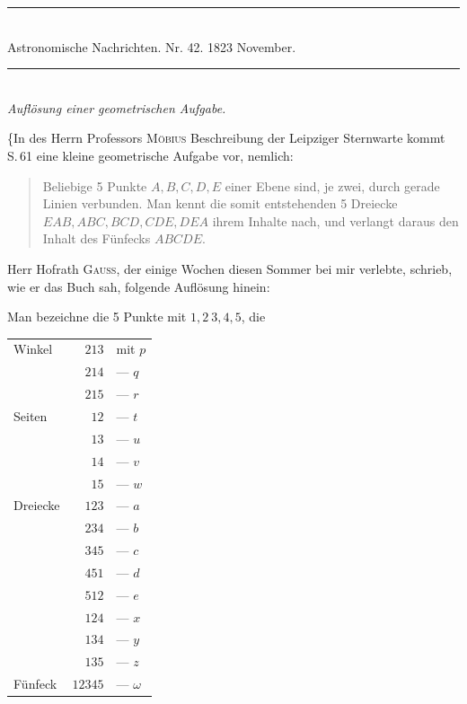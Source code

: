 \clearpage
{}%
\begin{center}
\rule{.8\textwidth}{.4pt}\\[4pt]
Astronomische Nachrichten. Nr. 42. 1823 November.\\[4pt]
\rule{.8\textwidth}{.4pt}\\[12pt]
\textit{Auflösung einer geometrischen Aufgabe.}
\end{center}
\hspace*{\parindent}\{In des Herrn Professors \textsc{Möbius} Beschreibung der Leipziger Sternwarte kommt S.\,61 eine kleine geometrische Aufgabe vor, nemlich:
\begin{quote}
Beliebige 5 Punkte \(A,B,C,D,E\) einer Ebene sind, je zwei, durch gerade Linien verbunden. Man kennt die somit entstehenden 5 Dreiecke \(EAB,ABC,BCD,CDE,DEA\) ihrem Inhalte nach, und verlangt daraus den Inhalt des Fünfecks \(ABCDE\).
\end{quote}
Herr Hofrath \textsc{Gauss}, der einige Wochen diesen Sommer bei mir verlebte, schrieb, wie er das Buch sah, folgende Auflösung hinein:

Man bezeichne die 5 Punkte mit \(1,2\ 3,4,5\), die
\begin{center}
\begin{tabular}{lrl}
Winkel&\(213\)&mit \(p\)\\
&\(214\)&— \(q\)\\
&\(215\)&— \(r\)\\\hline
Seiten&\(12\)&— \(t\)\\
&\(13\)&— \(u\)\\
&\(14\)&— \(v\)\\
&\(15\)&— \(w\)\\\hline
Dreiecke&\(123\)&— \(a\)\\
&\(234\)&— \(b\)\\
&\(345\)&— \(c\)\\
&\(451\)&— \(d\)\\
&\(512\)&— \(e\)\\
&\(124\)&— \(x\)\\
&\(134\)&— \(y\)\\
&\(135\)&— \(z\)\\\hline
Fünfeck&\(12345\)&— \(\omega\)
\end{tabular}
\end{center}
